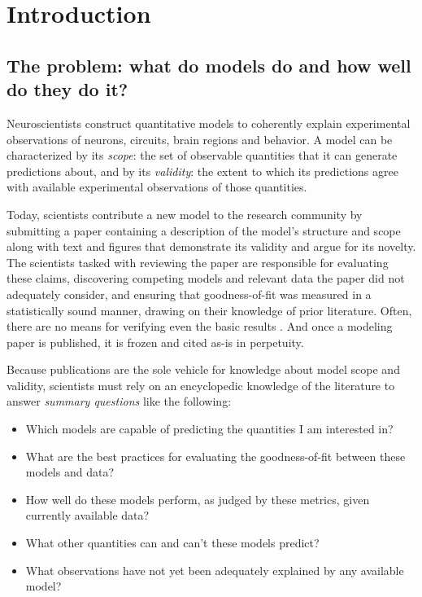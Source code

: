 \documentclass{frontiersSCNS}
\begin{document}
\section{Introduction}
\label{sec:introduction}
\subsection{The problem: what do models do and how well do they do it?}
Neuroscientists construct quantitative models to coherently explain experimental observations of neurons, circuits, brain regions and behavior. 
A model can be characterized by its \textit{scope}: the set of observable quantities that it can generate predictions about, and by its \textit{validity}: the extent to which its predictions agree with available experimental  observations of those quantities.

Today, scientists contribute a new model to the research community by submitting a paper containing a description of the model's structure and scope along with text and figures that demonstrate its validity and argue for its novelty.  
The scientists tasked with reviewing the paper are responsible for evaluating these claims, discovering competing models and relevant data the paper did not adequately consider, and ensuring that goodness-of-fit was measured in a statistically sound manner, drawing on their knowledge of prior literature. 
Often, there are no means for verifying even the basic results \citep{Donoho0815years}.
And once a modeling paper is published, it is frozen and cited as-is in perpetuity. 

Because publications are the sole vehicle for knowledge about model scope and validity, scientists must rely on an encyclopedic knowledge of the literature to answer \emph{summary questions} like the following:
\begin{itemize}
\item Which models are capable of predicting the quantities I am interested in?
\item What are the best practices for evaluating the goodness-of-fit between these models and  data?
\item How well do these models perform, as judged by these metrics, given currently available data?
\item What other quantities can and can't these models predict?
\item What observations have not yet been adequately explained by any available model?
\end{itemize}
\end{document}

